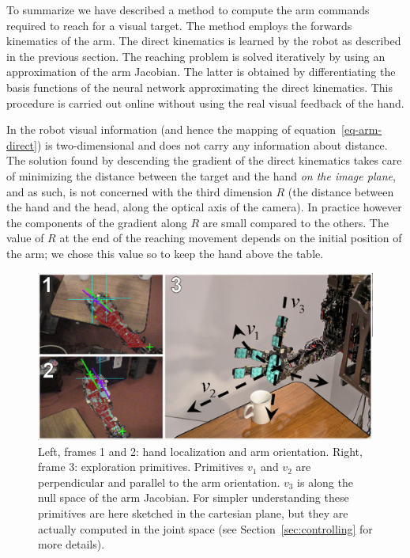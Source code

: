 To summarize we have described a method to compute the arm
commands required to reach for a visual target. The method employs
the forwards kinematics of the arm. The direct kinematics is
learned by the robot as described in the previous section. The
reaching problem is solved iteratively by using an approximation
of the arm Jacobian. The latter is obtained by differentiating the
basis functions of the neural network approximating the direct
kinematics. This procedure is carried out online without using the
real visual feedback of the hand.

In the robot visual information (and hence the mapping of 
equation~\ref{eq-arm-direct})
is two-dimensional and does not carry any information
about distance. The solution found by descending the gradient of the
direct kinematics takes care of minimizing the distance between the target
and the hand \emph{on the image plane}, and as such, is not concerned
with the third dimension $R$ (the distance between the hand and the head, 
along the optical axis of the camera).
In practice however the components of the gradient along $R$ are small
compared to the others. The value of $R$ at the end of the reaching movement
depends on the initial position of the arm; we chose this value so to keep
the hand above the table.
%
\begin{figure}[tb]
  \centerline{
    \includegraphics[width=\columnwidth, angle=0 ]{./figures/expl-directions.eps}
  }\caption{Left, frames 1 and 2: hand localization and arm
    orientation. Right, frame 3: exploration primitives. Primitives $v_1$
and $v_2$ are perpendicular and parallel to the arm orientation.
$v_3$ is along the null space of the arm Jacobian. For simpler understanding 
these primitives are here sketched in the cartesian plane, but 
they are actually computed in the joint space (see 
Section~\ref{sec:controlling} for more details).}
\label{fig:expl-directions}
\end{figure}
%
